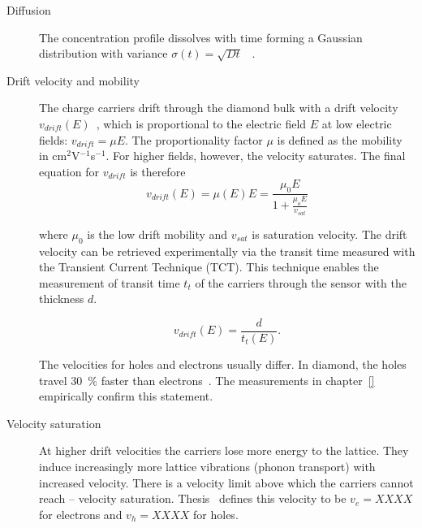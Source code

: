 \documentclass[twoside,12pt]{packages/mytustyle}  %
\begin{document}
\begin{description}

\item[Diffusion]
The concentration profile dissolves with time forming a Gaussian distribution with variance $\sigma(t)=\sqrt{Dt}$~\cite{} .

\item[Drift velocity and mobility]
The charge carriers drift through the diamond bulk with a drift velocity $v_{drift}(E)$~\cite{}, which is proportional to the electric field $E$ at low electric fields: $v_{drift} = \mu E$. The proportionality factor $\mu$ is defined as the mobility in cm$^2$V$^{-1}$s$^{-1}$. For higher fields, however, the velocity saturates. The final equation for $v_{drift}$ is therefore
\begin{equation}
\label{eq:vsat}
v_{drift}(E) = \mu(E)E= \frac{\mu_0 E}{1 + \frac{\mu_o E}{v_{sat}}}
\end{equation}

where $\mu_0$ is the low drift mobility and $v_{sat}$ is saturation velocity. The drift velocity can be retrieved experimentally via the transit time measured with the Transient Current Technique (TCT). This technique enables the measurement of transit time $t_t$ of the carriers through the sensor with the thickness $d$. 

\begin{equation}
\label{eq:vsat}
v_{drift}(E) = \frac{d}{t_t(E)}.
\end{equation}

The velocities for holes and electrons usually differ. In diamond, the holes travel 30~\% faster than electrons~\cite{}. The measurements in chapter~\ref{} empirically confirm this statement.

\item[Velocity saturation] At higher drift velocities the carriers lose more energy to the lattice. They induce increasingly more lattice vibrations (phonon transport) with increased velocity. There is a velocity limit above which the carriers cannot reach -- velocity saturation. Thesis~\cite{} defines this velocity to be $v_e=XXXX$ for electrons and $v_h=XXXX$ for holes.


\end{description}
\end{document}

